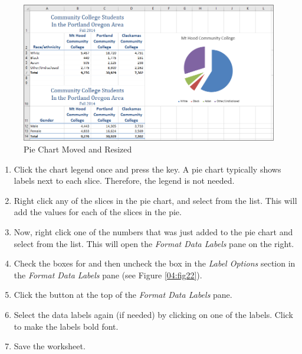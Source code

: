 \begin{figure}[H]
	\centering
	\includegraphics[width=\maxwidth{.95\linewidth}]{gfx/ch04_fig21}
	\caption{Pie Chart Moved and Resized}
	\label{04:fig21}
\end{figure}

\begin{enumerate}[resume]
	\item Click the chart legend once and press the  key. A pie chart typically shows labels next to each slice. Therefore, the legend is not needed.
	\item Right click any of the slices in the pie chart, and select  from the list. This will add the values for each of the slices in the pie.
	\item Now, right click one of the numbers that was just added to the pie chart and select  from the list. This will open the \textit{Format Data Labels} pane on the right.
	\item Check the boxes for  and  then uncheck the  box in the \textit{Label Options} section in the \textit{Format Data Labels} pane (see Figure \ref{04:fig22}).
	\item Click the  button at the top of the \textit{Format Data Labels} pane.
	\item Select the data labels again (if needed) by clicking on one of the labels. Click  to make the labels bold font.
	\item Save the worksheet.
\end{enumerate}

